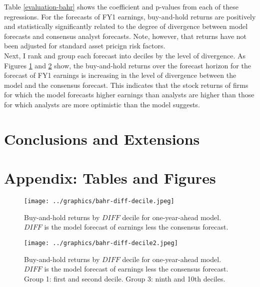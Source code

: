 \documentclass[12pt, letterpaper]{article}
\begin{document}
Table \ref{evaluation-bahr} shows the coefficient and p-values from each of these regressions. 
For the forecasts of FY1 earnings, buy-and-hold returns are positively and statistically 
significantly related to the degree of 
divergence between model forecasts and consensus analyst forecasts. Note, however, that
returns have not been adjusted for standard asset pricign risk factors.
\\

Next, I rank and group each forecast into deciles by the level of divergence. As Figures
\ref{bahr-diff-decile} and \ref{bahr-diff-decile2} show, the buy-and-hold returns over the forecast
horizon for the forecast of FY1 earnings is increasing in the level of divergence between the model
and the consensus forecast. This indicates that the stock returns of firms for which the model
forecasts higher earnings than analysts are higher than those for which analysts are more optimistic
than the model suggests.
\\

  
\section{Conclusions and Extensions}




\newpage
\section*{Appendix: Tables and Figures}
\newpage
\newpage
\newpage
\newpage
\newpage
\newpage
\newpage

  \begin{figure}[H]
  \begin{center}
    \texttt{[image: ../graphics/bahr-diff-decile.jpeg]}
    \captionsetup{width=4in, font=footnotesize}
    \caption{Buy-and-hold returns by $DIFF$ decile for one-year-ahead model. $DIFF$ is the model 
    forecast of earnings less the consensus forecast.}
    \label{bahr-diff-decile}
  \end{center}
  \end{figure}

  \begin{figure}[H]
  \begin{center}
    \texttt{[image: ../graphics/bahr-diff-decile2.jpeg]}
    \captionsetup{width=4in, font=footnotesize}
    \caption{Buy-and-hold returns by $DIFF$ decile for one-year-ahead model. $DIFF$ is the model 
    forecast of earnings less the consensus forecast. Group 1: first and second decile. Group 3: 
    ninth and 10th deciles.}
    \label{bahr-diff-decile2}
  \end{center}
  \end{figure}
\end{document}
